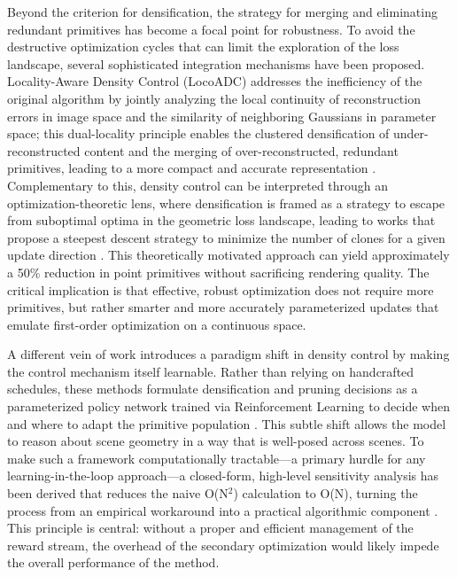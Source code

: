 \documentclass[11pt,a4paper]{article}
\begin{document}
Beyond the criterion for densification, the strategy for merging and eliminating redundant primitives has become a focal point for robustness. To avoid the destructive optimization cycles that can limit the exploration of the loss landscape, several sophisticated integration mechanisms have been proposed. Locality-Aware Density Control (LocoADC) addresses the inefficiency of the original algorithm by jointly analyzing the local continuity of reconstruction errors in image space and the similarity of neighboring Gaussians in parameter space; this dual-locality principle enables the clustered densification of under-reconstructed content and the merging of over-reconstructed, redundant primitives, leading to a more compact and accurate representation \cite{arxiv:2607.17896v1}. Complementary to this, density control can be interpreted through an optimization-theoretic lens, where densification is framed as a strategy to escape from suboptimal optima in the geometric loss landscape, leading to works that propose a steepest descent strategy to minimize the number of clones for a given update direction \cite{arxiv:2505.05587v1}. This theoretically motivated approach can yield approximately a 50\% reduction in point primitives without sacrificing rendering quality. The critical implication is that effective, robust optimization does not require more primitives, but rather smarter and more accurately parameterized updates that emulate first-order optimization on a continuous space.

A different vein of work introduces a paradigm shift in density control by making the control mechanism itself learnable. Rather than relying on handcrafted schedules, these methods formulate densification and pruning decisions as a parameterized policy network trained via Reinforcement Learning to decide when and where to adapt the primitive population \cite{arxiv:2605.00408v2}. This subtle shift allows the model to reason about scene geometry in a way that is well-posed across scenes. To make such a framework computationally tractable---a primary hurdle for any learning-in-the-loop approach---a closed-form, high-level sensitivity analysis has been derived that reduces the naive O(N$^{2}$) calculation to O(N), turning the process from an empirical workaround into a practical algorithmic component \cite{arxiv:2605.00408v2}. This principle is central: without a proper and efficient management of the reward stream, the overhead of the secondary optimization would likely impede the overall performance of the method.
\end{document}
